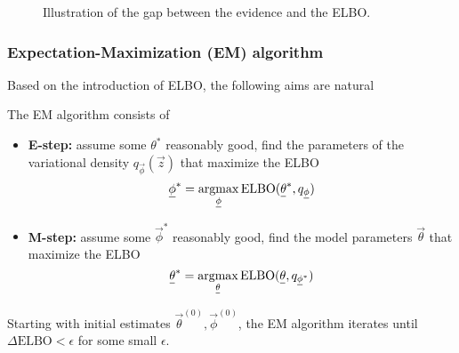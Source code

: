 \begin{figure}[!htb]
    \centering
    
    \caption{Illustration of the gap between the evidence and the ELBO.}
    \label{fig:elbo_gap}
\end{figure}


\subsubsection{Expectation-Maximization (EM) algorithm}
Based on the introduction of ELBO, the following aims are natural

The EM algorithm consists of
\begin{itemize}
    \item \textbf{E-step:} assume some $\theta^*$ reasonably good, find the parameters of the
    variational density $q_{\vec{\phi}}(\vec{z})$ that maximize the ELBO
    \begin{equation}
        \vec{\phi}^* = \argmax_{\vec{\phi}} \text{ELBO}(\vec{\theta}^*, q_{\vec{\phi}})
    \end{equation}
    \item \textbf{M-step:} assume some $\vec{\phi}^*$ reasonably good, find
    the model parameters $\vec{\theta}$ that maximize the ELBO
    \begin{equation}
        \vec{\theta}^* = \argmax_{\vec{\theta}} \text{ELBO}(\vec{\theta}, q_{\vec{\phi}^*})
    \end{equation}
\end{itemize}

Starting with initial estimates $\vec{\theta}^{(0)}, \vec{\phi}^{(0)}$, the EM algorithm iterates
until $\Delta \text{ELBO} < \epsilon$ for some small $\epsilon$.


